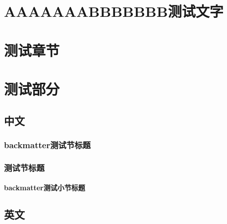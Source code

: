 \documentclass[color=green]{textbook-cn}%
\begin{document}


\backmatter

\lipsum


\part*{AAAAAAABBBBBBB测试文字}
\part{测试章节}
\part[宝贝儿]{测试部分}


\lipsum
\makeatletter























\lipsum[2]


\makeatother









\begin{Appendix}

\chapter[PPPPPLLL]{中文}
\thepart\zhlipsum

\section{backmatter测试节标题}
\section{测试节标题}

\subsection{backmatter测试小节标题}


\begin{Definition}[定义名称]
	\lipsum[2]
\end{Definition}




\chapter{英文}
\zhlipsum
\end{Appendix}
\end{document}
